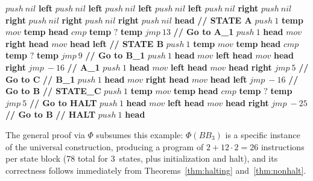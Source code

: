 \begin{algorithm}[H]
   \caption{3-State Busy Beaver Turing machine in \sculpt}
   \label{alg:busybeaver}
   \small
   \begin{algorithmic}
   \State $push~nil$ \textbf{left}
   \State $push~nil$ \textbf{left}
   \State $push~nil$ \textbf{left}
   \State $push~nil$ \textbf{left}
   \State $push~nil$ \textbf{right}
   \State $push~nil$ \textbf{right}
   \State $push~nil$ \textbf{right}
   \State $push~nil$ \textbf{right}
   \State $push~nil$ \textbf{head}
   \State \textbf{// STATE A}
   \State $push~1$ \textbf{temp}
   \State $mov$ \textbf{temp} \textbf{head}
   \State $cmp$ \textbf{temp}
   \State $?$ \textbf{temp}
   \State $jmp~13$ \textbf{// Go to A\_1}
   \State $push~1$ \textbf{head}
   \State $mov$ \textbf{right} \textbf{head}
   \State $mov$ \textbf{head} \textbf{left}
   \State \textbf{// STATE B}
   \State $push~1$ \textbf{temp}
   \State $mov$ \textbf{temp} \textbf{head}
   \State $cmp$ \textbf{temp}
   \State $?$ \textbf{temp}
   \State $jmp~9$ \textbf{// Go to B\_1}
   \State $push~1$ \textbf{head}
   \State $mov$ \textbf{left} \textbf{head}
   \State $mov$ \textbf{head} \textbf{right}
   \State $jmp~-16$ 
   \State \textbf{// A\_1}
   \State $push~1$ \textbf{head}
   \State $mov$ \textbf{left} \textbf{head}
   \State $mov$ \textbf{head} \textbf{right}
   \State $jmp~5$ \textbf{// Go to C}
   \State \textbf{// B\_1}
   \State $push~1$ \textbf{head}
   \State $mov$ \textbf{right} \textbf{head}
   \State $mov$ \textbf{head} \textbf{left}
   \State $jmp~-16$ \textbf{// Go to B}
   \State \textbf{// STATE\_C}
   \State $push~1$ \textbf{temp}
   \State $mov$ \textbf{temp} \textbf{head}
   \State $cmp$ \textbf{temp}
   \State $?$ \textbf{temp}
   \State $jmp~5$ \textbf{// Go to HALT}
   \State $push~1$ \textbf{head}
   \State $mov$ \textbf{left} \textbf{head}
   \State $mov$ \textbf{head} \textbf{right}
   \State $jmp~-25$ \textbf{// Go to B}
   \State \textbf{// HALT}
   \State $push~1$ \textbf{head}
   \end{algorithmic}
\end{algorithm}

\normalsize


The general proof via $\Phi$ subsumes this example: $\Phi(BB_3)$ is a specific instance of the universal construction, producing a program of $2 + 12 \cdot 2 = 26$ instructions per state block (78 total for 3~states, plus initialization and halt), and its correctness follows immediately from Theorems~\ref{thm:halting} and~\ref{thm:nonhalt}.

